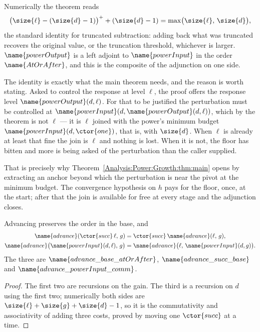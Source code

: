\begin{designnote}
\label{Analysis:Power:Growth:note:adjoint}
Numerically the theorem reads
\[
  \bigl(\size{\ell} - (\size{d}-1)\bigr)^{+} + (\size{d}-1)
    = \max\bigl(\size{\ell},\, \size{d}\bigr),
\]
the standard identity for truncated subtraction: adding back what was
truncated recovers the original value, or the truncation threshold, whichever
is larger.  $\name{powerOutput}$ is a left adjoint to $\name{powerInput}$ in
the order $\name{AtOrAfter}$, and this is the composite of the adjunction on
one side.

The identity is exactly what the main theorem needs, and the reason is worth
stating.  Asked to control the response at level $\ell$, the proof offers the
response level $\name{powerOutput}(d,\ell)$.  For that to be justified the
perturbation must be controlled at $\name{powerInput}(d, \name{powerOutput}(d,
\ell))$, which by the theorem is not $\ell$ --- it is $\ell$ joined with the
power's minimum budget $\name{powerInput}(d,\ctor{one})$, that is, with
$\size{d}$.  When $\ell$ is already at least that fine the join is $\ell$ and
nothing is lost.  When it is not, the floor has bitten and more is being asked
of the perturbation than the caller supplied.

That is precisely why
Theorem~\ref{Analysis:Power:Growth:thm:main} opens by extracting an anchor
beyond which the perturbation is near the pivot at the minimum budget.  The
convergence hypothesis on $h$ pays for the floor, once, at the start; after
that the join is available for free at every stage and the adjunction closes.
\end{designnote}

\begin{lemma}
\label{Analysis:Power:Growth:lem:advance}
Advancing preserves the order in the base, and
\begin{align*}
  \name{advance}(\ctor{succ}\,\ell,\, g)
    &= \ctor{succ}\,\name{advance}(\ell,\,g), \\
  \name{advance}\bigl(\name{powerInput}(d,\ell),\, g\bigr)
    &= \name{advance}\bigl(\ell,\, \name{powerInput}(d,g)\bigr).
\end{align*}
The three are $\name{advance\_base\_atOrAfter}$,
$\name{advance\_succ\_base}$ and $\name{advance\_powerInput\_comm}$.
\end{lemma}

\begin{proof}
The first two are recursions on the gain.  The third is a recursion on $d$
using the first two; numerically both sides are
$\size{\ell} + \size{g} + \size{d} - 1$, so it is the commutativity and
associativity of adding three costs, proved by moving one $\ctor{succ}$ at a
time.
\end{proof}

